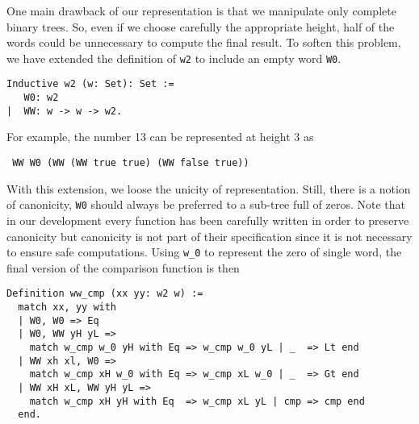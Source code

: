 One main drawback of our representation is that we manipulate only complete 
binary trees. 
So, even if we choose carefully the appropriate height, half of the words 
could be unnecessary to compute the final result. 
To soften this problem, we have extended the definition of {\tt w2} 
to include an empty word {\tt W0}. 
\begin{verbatim}
Inductive w2 (w: Set): Set :=  
   W0: w2
|  WW: w -> w -> w2.
\end{verbatim}
For example, the number 13 can be represented at height 3 as
\begin{verbatim}
 WW W0 (WW (WW true true) (WW false true))
\end{verbatim}
With this extension, we loose the unicity of representation. Still, there is a notion
of canonicity, {\tt W0} should always be preferred to a sub-tree full of zeros. Note that in
our development every function has been carefully written in order to preserve canonicity but
canonicity  is not part of their specification since it is not necessary to ensure safe computations.
Using {\tt w\_0} to represent the zero of single word, 
the final version of the comparison function is then
\begin{verbatim}
Definition ww_cmp (xx yy: w2 w) :=
  match xx, yy with
  | W0, W0 => Eq
  | W0, WW yH yL =>
    match w_cmp w_0 yH with Eq => w_cmp w_0 yL | _  => Lt end
  | WW xh xl, W0 =>
    match w_cmp xH w_0 with Eq => w_cmp xL w_0 | _  => Gt end
  | WW xH xL, WW yH yL =>
    match w_cmp xH yH with Eq  => w_cmp xL yL | cmp => cmp end
  end.
\end{verbatim}


